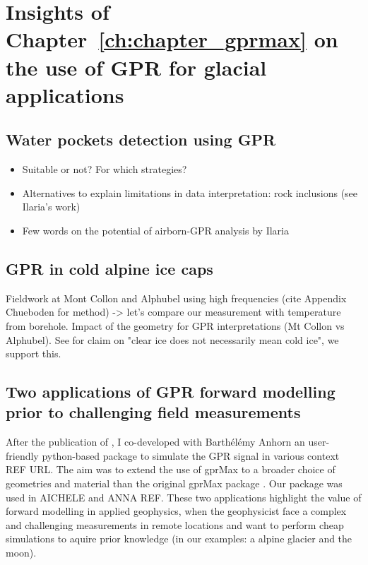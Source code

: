 \section{Insights of Chapter~\ref{ch:chapter_gprmax} on the use of GPR for glacial applications}


\subsection{Water pockets detection using GPR}

\begin{itemize}
    \item Suitable or not? For which strategies? 
    \item Alternatives to explain limitations in data interpretation: rock inclusions (see Ilaria's work)
    \item Few words on the potential of airborn-GPR analysis by Ilaria
\end{itemize}

\subsection{GPR in cold alpine ice caps}

Fieldwork at Mont Collon and Alphubel using high frequencies (cite Appendix Chueboden for method) -> let's compare our measurement with temperature from borehole. Impact of the geometry for GPR interpretations (Mt Collon vs Alphubel). See \cite{Brown&al2009} for claim on "clear ice does not necessarily mean cold ice", we support this. 

\subsection{Two applications of GPR forward modelling prior to challenging field measurements}

After the publication of \citep{Ogier&al2023}, I co-developed with Barthélémy Anhorn an user-friendly python-based package to simulate the GPR signal in various context REF URL. The aim was to extend the use of gprMax to a broader choice of geometries and material than the original gprMax package \citep{Warren&al2016}. Our package was used in AICHELE and ANNA REF. These two applications highlight the value of forward modelling in applied geophysics, when the geophysicist face a complex and challenging measurements in remote locations and want to perform cheap simulations to aquire prior knowledge (in our examples: a alpine glacier and the moon). 


